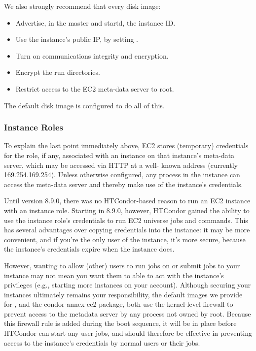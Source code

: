We also strongly recommend that every  disk image:

\begin{itemize}
\item  Advertise, in the master and startd, the instance ID.
\item  Use the instance's public IP, by setting .
\item  Turn on communications integrity and encryption.
\item  Encrypt the run directories.
\item  Restrict access to the EC2 meta-data server to root.
\end{itemize}

The default disk image is configured to do all of this.

\subsubsection{Instance Roles}
\label{sec:Instance Roles}

To explain the last point immediately above, EC2 stores (temporary)
credentials for the role, if any, associated with an instance on that
instance's meta-data server, which may be accessed via HTTP at a well-
known address (currently 169.254.169.254).  Unless otherwise configured,
any process in the instance can access the meta-data server and thereby
make use of the instance's credentials.

Until version 8.9.0, there was no HTCondor-based reason to run an EC2
instance with an instance role.  Starting in 8.9.0, however, HTCondor
gained the ability to use the instance role's credentials to run EC2
universe jobs and  commands.  This has several advantages
over copying credentials into the instance: it may be more convenient,
and if you're the only user of the instance, it's more secure, because
the instance's credentials expire when the instance does.

However, wanting to allow (other) users to run jobs on or submit jobs to
your instance may not mean you want them to able to act with the instance's
privileges (e.g., starting more instances on your account).  Although
securing your instances ultimately remains your responsibility, the default
images we provide for , and the condor-annex-ec2 package, both
use the kernel-level firewall to prevent access to the metadata server by any
process not owned by root.  Because this firewall rule is added during the
boot sequence, it will be in place before HTCondor can start any user jobs,
and should therefore be effective in preventing access to the instance's
credentials by normal users or their jobs.
